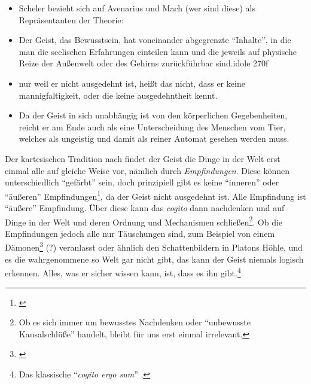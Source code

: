 \documentclass[a4paper, 12pt]{article}
\begin{document}
\begin{onehalfspace}
\begin{itemize}
  \item Scheler bezieht sich auf Avenarius und Mach (wer sind diese) als Repräsentanten der Theorie: 
  \item Der Geist, das Bewusstsein, hat voneinander abgegrenzte "`Inhalte"', in die man die seelischen Erfahrungen einteilen kann und die jeweils auf physische Reize der Außenwelt oder des Gehirns zurückführbar sind.idole 270f
  \item nur weil er nicht ausgedehnt ist, heißt das nicht, dass er keine mannigfaltigkeit, oder die keine ausgedehntheit kennt.
  \item Da der Geist in sich unabhängig ist von den körperlichen Gegebenheiten, reicht er am Ende auch als eine Unterscheidung des Menschen vom Tier, welches als ungeistig und damit als reiner Automat gesehen werden muss.
\end{itemize}


Der kartesischen Tradition nach findet der Geist die Dinge in der Welt erst einmal alle auf gleiche Weise vor, nämlich durch \emph{Empfindungen}. Diese können unterschiedlich "`gefärbt"' sein, doch prinzipiell gibt es keine "`inneren"' oder "`äußeren"' Empfindungen\footnote{\Cite[Vgl.][S. ?? (501?)]{scheler-ethik}}, da der Geist nicht ausgedehnt ist. Alle Empfindung ist "`äußere"' Empfindung. Über diese kann das \emph{cogito} dann nachdenken und auf Dinge in der Welt und deren Ordnung und Mechanismen schließen\footnote{Ob es sich immer um bewusstes Nachdenken oder "`unbewusste Kausalschlüße"' handelt, bleibt für uns erst einmal irrelevant.}. Ob die Empfindungen jedoch alle nur Täuschungen sind, zum Beispiel von einem Dämonen\footnote{\Cite[Vgl.][S.?]{descartes}} (?) veranlasst oder ähnlich den Schattenbildern in Platons Höhle, und es die wahrgenommene so Welt gar nicht gibt, das kann der Geist niemals logisch erkennen. Alles, was er sicher wissen kann, ist, dass es ihn gibt.\footnote{Das klassische "`\emph{cogito ergo sum}"' .}



\end{onehalfspace}
\end{document}
